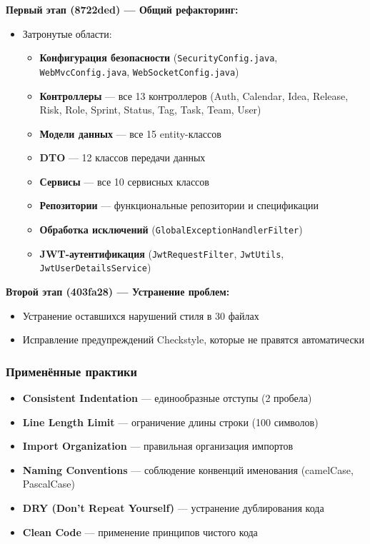 \documentclass{article}
\begin{document}
\textbf{Первый этап (8722ded) --- Общий рефакторинг:}
\begin{itemize}
    \item Затронутые области:
    \begin{itemize}
        \item \textbf{Конфигурация безопасности} (\texttt{SecurityConfig.java}, \texttt{WebMvcConfig.java}, \texttt{WebSocketConfig.java})
        \item \textbf{Контроллеры} --- все 13 контроллеров (Auth, Calendar, Idea, Release, Risk, Role, Sprint, Status, Tag, Task, Team, User)
        \item \textbf{Модели данных} --- все 15 entity-классов
        \item \textbf{DTO} --- 12 классов передачи данных
        \item \textbf{Сервисы} --- все 10 сервисных классов
        \item \textbf{Репозитории} --- функциональные репозитории и спецификации
        \item \textbf{Обработка исключений} (\texttt{GlobalExceptionHandlerFilter})
        \item \textbf{JWT-аутентификация} (\texttt{JwtRequestFilter}, \texttt{JwtUtils}, \texttt{JwtUserDetailsService})
    \end{itemize}
\end{itemize}

\textbf{Второй этап (403fa28) --- Устранение проблем:}
\begin{itemize}
    \item Устранение оставшихся нарушений стиля в 30 файлах
    \item Исправление предупреждений Checkstyle, которые не правятся автоматически
\end{itemize}

\subsubsection{Применённые практики}
\begin{itemize}
    \item \textbf{Consistent Indentation} --- единообразные отступы (2 пробела)
    \item \textbf{Line Length Limit} --- ограничение длины строки (100 символов)
    \item \textbf{Import Organization} --- правильная организация импортов
    \item \textbf{Naming Conventions} --- соблюдение конвенций именования (camelCase, PascalCase)
\end{itemize}
\begin{itemize}
    \item \textbf{DRY (Don't Repeat Yourself)} --- устранение дублирования кода
    \item \textbf{Clean Code} --- применение принципов чистого кода
\end{itemize}
\end{document}
